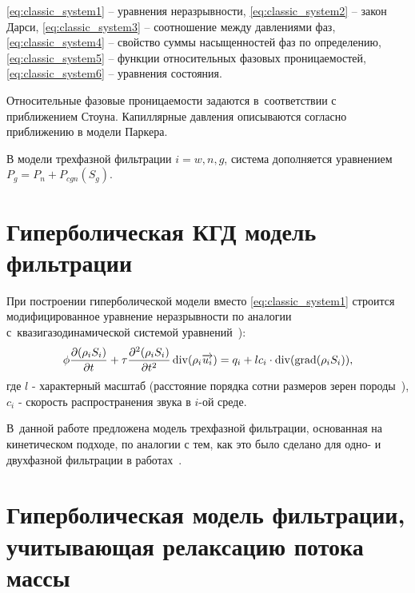 \eqref{eq:classic_system1} -- уравнения неразрывности,
\eqref{eq:classic_system2} -- закон Дарси,
\eqref{eq:classic_system3} -- соотношение между давлениями фаз,
\eqref{eq:classic_system4} -- свойство суммы насыщенностей фаз по определению,
\eqref{eq:classic_system5} -- функции относительных фазовых проницаемостей,
\eqref{eq:classic_system6} -- уравнения состояния.

Относительные фазовые проницаемости задаются в~соответствии с~
приближением Стоуна\cite{Aziz-Settari}.
Капиллярные давления описываются согласно приближению в модели Паркера\cite{Parker}.

В модели трехфазной фильтрации $i = w,n,g$, система дополняется уравнением $P_g = P_n + P_{cgn}({S}_g)$.

\section{Гиперболическая КГД модель фильтрации} \label{sec:ch1/sec2}

При построении гиперболической модели вместо \eqref{eq:classic_system1} строится модифицированное уравнение неразрывности по аналогии с~квазигазодинамической системой уравнений~\cite{Chetverushkin-Mathmod}):
\begin{equation}
 \label{mass_mod}
  \phi \frac{\partial (\rho_i S_i)}{\partial t} + \tau \frac{\partial^2 (\rho_i S_i)}{\partial t^2} 
  \mathop{\mathrm{div}}\nolimits(\rho_i \overrightarrow{u_i}) = q_i + l c_i \cdot \mathop{\mathrm{div}}\nolimits(\mathop{\mathrm{grad}}\nolimits(\rho_i S_i)),
\end{equation}
где $l$ - характерный масштаб (расстояние порядка сотни размеров зерен породы~\cite{Chetverushkin}),
$c_i$ - скорость распространения звука в $i$-ой среде.

В~данной работе предложена модель трехфазной фильтрации, основанная на кинетическом подходе, по аналогии с тем, как это было сделано для одно- и двухфазной фильтрации в работах~\cite{Mathmod-2010,Mathmod-2011}.

\section{Гиперболическая модель фильтрации, учитывающая релаксацию потока массы} \label{sec:ch1/sec3}

